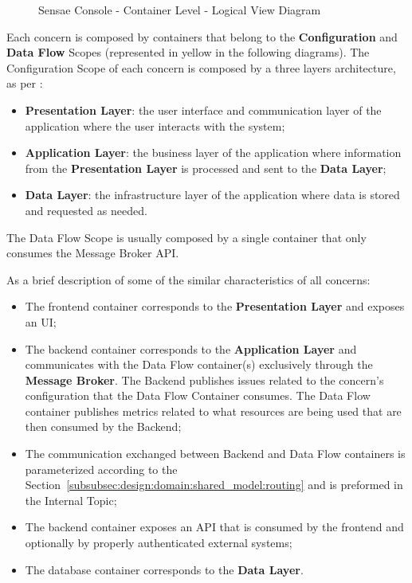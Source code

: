 \begin{figure}
   \centering
   \resizebox{0.8\columnwidth}{!}
   {
      
   }
   \caption[Sensae Console - Container Level - Logical View Diagram]{Sensae Console - Container Level - Logical View Diagram}
      \label{fig:design:architecture:platform:containers:logical:complete}
\end{figure}

Each concern is composed by containers that belong to the \textbf{Configuration} and \textbf{Data Flow} Scopes (represented in yellow in the following diagrams).
The Configuration Scope of each concern is composed by a three layers architecture, as per \cite{3tier}:

\begin{itemize}
   \item \textbf{Presentation Layer}: the user interface and communication layer of the application where the user interacts with the system;
   \item \textbf{Application Layer}: the business layer of the application where information from the \textbf{Presentation Layer} is processed and sent to the \textbf{Data Layer};
   \item \textbf{Data Layer}: the infrastructure layer of the application where data is stored and requested as needed.
\end{itemize}

The Data Flow Scope is usually composed by a single container that only consumes the Message Broker \gls{API}.

As a brief description of some of the similar characteristics of all concerns:

\begin{itemize}
   \item The frontend container corresponds to the \textbf{Presentation Layer} and exposes an \gls{UI};
   \item The backend container corresponds to the \textbf{Application Layer} and communicates with the Data Flow container(s) exclusively through the \textbf{Message Broker}. The Backend publishes issues related to the concern's configuration that the Data Flow Container consumes. The Data Flow container publishes metrics related to what resources are being used that are then consumed by the Backend;
   \item The communication exchanged between Backend and Data Flow containers is parameterized according to the Section~\ref{subsubsec:design:domain:shared_model:routing} and is preformed in the Internal Topic;
   \item The backend container exposes an \gls{API} that is consumed by the frontend and optionally by properly authenticated external systems;
   \item The database container corresponds to the \textbf{Data Layer}.
\end{itemize}

